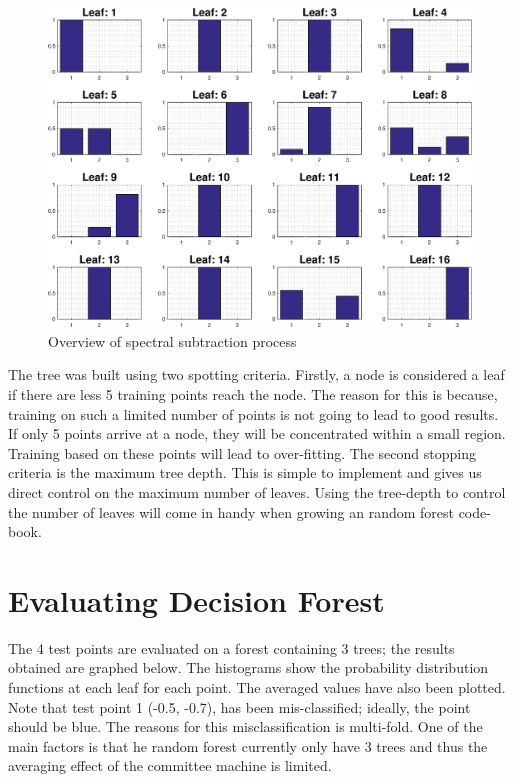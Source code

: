 \documentclass[a4paper,pra,twocolumn,10pt,aps,longbibliography,nobalancelastpage]{revtex4-1}
\begin{document}
\begin{figure}[H]
	\centering
    \includegraphics[width=0.60\columnwidth]{leaf_node_distributions_1}
    \caption{Overview of spectral subtraction process}
    \label{fig:leaf_nodes}
\end{figure}

The tree was built using two spotting criteria. Firstly, a node is considered a leaf if there are less 5 training points reach the node. The reason for this is because, training on such a limited number of points is not going to lead to good results. If only 5 points arrive at a node, they will be concentrated within a small region. Training based on these points will lead to over-fitting. The second stopping criteria is the maximum tree depth. This is simple to implement and gives us direct control on the maximum number of leaves. Using the tree-depth to control the number of leaves will come in handy when growing an random forest code-book.

\section{Evaluating Decision Forest}

The 4 test points are evaluated on a forest containing 3 trees; the results obtained are graphed below. The histograms show the probability distribution functions at each leaf for each point. The averaged values have also been plotted. Note that test point 1 (-0.5, -0.7), has been mis-classified; ideally, the point should be blue. The reasons for this misclassification is multi-fold. One of the main factors is that he random forest currently only have 3 trees and thus the averaging effect of the committee machine is limited.
\end{document}
